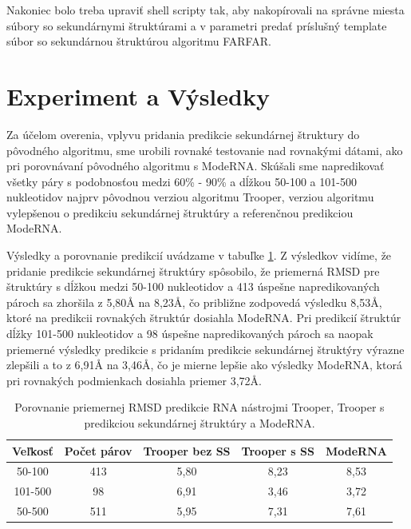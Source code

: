 \indent Nakoniec bolo treba upraviť shell scripty tak, aby nakopírovali na správne miesta súbory so sekundárnymi štruktúrami a v parametri predať príslušný template súbor so sekundárnou štruktúrou algoritmu FARFAR.

\section{Experiment a Výsledky}
Za účelom overenia, vplyvu pridania predikcie sekundárnej štruktury do pôvodného algoritmu, sme urobili rovnaké testovanie nad rovnakými dátami, ako pri porovnávaní pôvodného algoritmu s ModeRNA. Skúšali sme napredikovať všetky páry s podobnosťou medzi 60\% - 90\% a dĺžkou 50-100 a 101-500 nukleotidov najprv pôvodnou verziou algoritmu Trooper, verziou algoritmu vylepšenou o predikciu sekundárnej štruktúry a referenčnou predikciou ModeRNA. 


\indent  Výsledky a porovnanie predikcií uvádzame v tabuľke \ref{tab5.1}. Z výsledkov vidíme, že pridanie predikcie sekundárnej štruktúry spôsobilo, že priemerná RMSD pre štruktúry s dĺžkou medzi 50-100 nukleotidov a 413 úspešne napredikovaných pároch sa zhoršila z 5,80Å na 8,23Å, čo približne zodpovedá výsledku 8,53Å, ktoré na predikcii rovnakých štruktúr dosiahla ModeRNA. Pri predikcií štruktúr dĺžky 101-500 nukleotidov a 98 úspešne napredikovaných pároch sa naopak priemerné výsledky predikcie s pridaním predikcie sekundárnej štruktýry výrazne zlepšili a to z 6,91Å na 3,46Å, čo je mierne lepšie ako výsledky ModeRNA, ktorá pri rovnakých podmienkach dosiahla priemer 3,72Å. 
\begin{table}[b!]
\centering
\begin{tabular}{ccccc}
\toprule
Veľkosť & Počet párov & Trooper bez SS & Trooper s SS & ModeRNA\\
\midrule
50-100  & 413 & 5,80  & 8,23 & 8,53\\
101-500  & 98 & 6,91  & 3,46 & 3,72\\
\bottomrule
50-500  &  511 & 5,95  & 7,31 & 7,61\\
\end{tabular}
\caption{Porovnanie priemernej RMSD predikcie RNA nástrojmi Trooper, Trooper s predikciou sekundárnej štruktúry a ModeRNA. }\label{tab5.1}
\end{table}


